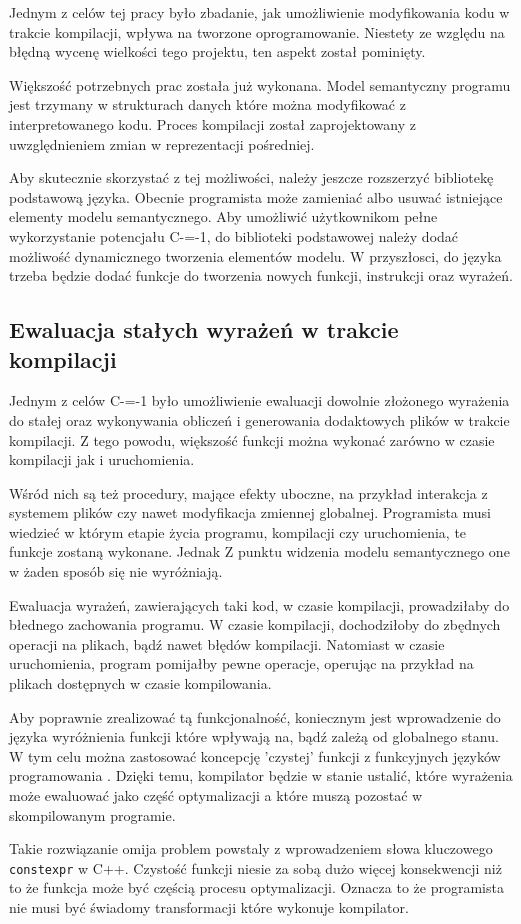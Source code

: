 Jednym z celów tej pracy było zbadanie, jak umożliwienie modyfikowania kodu w trakcie kompilacji, wpływa na tworzone oprogramowanie.
Niestety ze względu na błędną wycenę wielkości tego projektu, ten aspekt został pominięty.

Większość potrzebnych prac została już wykonana.
Model semantyczny programu jest trzymany w strukturach danych które można modyfikować z interpretowanego kodu.
Proces kompilacji został zaprojektowany z uwzględnieniem zmian w reprezentacji pośredniej.

Aby skutecznie skorzystać z tej możliwości, należy jeszcze rozszerzyć bibliotekę podstawową języka.
Obecnie programista może zamieniać albo usuwać istniejące elementy modelu semantycznego.
Aby umożliwić użytkownikom pełne wykorzystanie potencjału C-=-1, do biblioteki podstawowej należy dodać możliwość dynamicznego tworzenia elementów modelu.
W przyszłosci, do języka trzeba będzie dodać funkcje do tworzenia nowych funkcji, instrukcji oraz wyrażeń.

\subsection{Ewaluacja stałych wyrażeń w trakcie kompilacji}

Jednym z celów C-=-1 było umożliwienie ewaluacji dowolnie złożonego wyrażenia do stałej oraz wykonywania obliczeń i generowania dodaktowych plików w trakcie kompilacji.
Z tego powodu, większość funkcji można wykonać zarówno w czasie kompilacji jak i uruchomienia.

Wśród nich są też procedury, mające efekty uboczne, na przykład interakcja z systemem plików czy nawet modyfikacja zmiennej globalnej.
Programista musi wiedzieć w którym etapie życia programu, kompilacji czy uruchomienia, te funkcje zostaną wykonane.
Jednak Z punktu widzenia modelu semantycznego one w żaden sposób się nie wyróżniają.

Ewaluacja wyrażeń, zawierających taki kod, w czasie kompilacji, prowadziłaby do błednego zachowania programu.
W czasie kompilacji, dochodziłoby do zbędnych operacji na plikach, bądź nawet błędów kompilacji.
Natomiast w czasie uruchomienia, program pomijałby pewne operacje, operując na przykład na plikach dostępnych w czasie kompilowania.

Aby poprawnie zrealizować tą funkcjonalność, koniecznym jest wprowadzenie do języka wyróżnienia funkcji które wpływają na, bądź zależą od globalnego stanu.
W tym celu można zastosować koncepcję 'czystej' funkcji z funkcyjnych języków programowania \cite{McLoughlin1989ImperativeEF}.
Dzięki temu, kompilator będzie w stanie ustalić, które wyrażenia może ewaluować jako część optymalizacji a które muszą pozostać w skompilowanym programie.

Takie rozwiązanie omija problem powstaly z wprowadzeniem słowa kluczowego \lstinline{constexpr} w C++\cite{Klimiankou:contexpr_great_good_wrong_idea}.
Czystość funkcji niesie za sobą dużo więcej konsekwencji niż to że funkcja może być częścią procesu optymalizacji.
Oznacza to że programista nie musi być świadomy transformacji które wykonuje kompilator.

